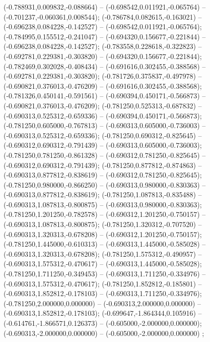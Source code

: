 (-0.788931,0.009832,-0.088664) -- (-0.698542,0.011921,-0.065764) -- (-0.701237,-0.060361,0.008544);
 (-0.786784,0.082615,-0.163021) -- (-0.696238,0.084228,-0.142527) -- (-0.698542,0.011921,-0.065764);
 (-0.784995,0.155512,-0.241047) -- (-0.694320,0.156677,-0.221844) -- (-0.696238,0.084228,-0.142527);
 (-0.783558,0.228618,-0.322823) -- (-0.692781,0.229381,-0.303820) -- (-0.694320,0.156677,-0.221844);
 (-0.782469,0.302028,-0.408434) -- (-0.691616,0.302455,-0.388568) -- (-0.692781,0.229381,-0.303820);
 (-0.781726,0.375837,-0.497978) -- (-0.690821,0.376013,-0.476209) -- (-0.691616,0.302455,-0.388568);
 (-0.781326,0.450141,-0.591561) -- (-0.690394,0.450171,-0.566873) -- (-0.690821,0.376013,-0.476209);
 (-0.781250,0.525313,-0.687832) -- (-0.690313,0.525312,-0.659336) -- (-0.690394,0.450171,-0.566873);
 (-0.781250,0.605000,-0.767813) -- (-0.690313,0.605000,-0.736003) -- (-0.690313,0.525312,-0.659336);
 (-0.781250,0.690312,-0.825645) -- (-0.690312,0.690312,-0.791439) -- (-0.690313,0.605000,-0.736003);
 (-0.781250,0.781250,-0.861328) -- (-0.690312,0.781250,-0.825645) -- (-0.690312,0.690312,-0.791439);
 (-0.781250,0.877812,-0.874863) -- (-0.690313,0.877812,-0.838619) -- (-0.690312,0.781250,-0.825645);
 (-0.781250,0.980000,-0.866250) -- (-0.690313,0.980000,-0.830363) -- (-0.690313,0.877812,-0.838619);
 (-0.781250,1.087813,-0.835488) -- (-0.690313,1.087813,-0.800875) -- (-0.690313,0.980000,-0.830363);
 (-0.781250,1.201250,-0.782578) -- (-0.690312,1.201250,-0.750157) -- (-0.690313,1.087813,-0.800875);
 (-0.781250,1.320312,-0.707520) -- (-0.690313,1.320313,-0.678208) -- (-0.690312,1.201250,-0.750157);
 (-0.781250,1.445000,-0.610313) -- (-0.690313,1.445000,-0.585028) -- (-0.690313,1.320313,-0.678208);
 (-0.781250,1.575312,-0.490957) -- (-0.690313,1.575312,-0.470617) -- (-0.690313,1.445000,-0.585028);
 (-0.781250,1.711250,-0.349453) -- (-0.690313,1.711250,-0.334976) -- (-0.690313,1.575312,-0.470617);
 (-0.781250,1.852812,-0.185801) -- (-0.690313,1.852812,-0.178103) -- (-0.690313,1.711250,-0.334976);
 (-0.781250,2.000000,0.000000) -- (-0.690313,2.000000,0.000000) -- (-0.690313,1.852812,-0.178103);
 (-0.699647,-1.864344,0.105916) -- (-0.614761,-1.866571,0.126373) -- (-0.605000,-2.000000,0.000000);
 (-0.690313,-2.000000,0.000000) -- (-0.605000,-2.000000,0.000000) ;

